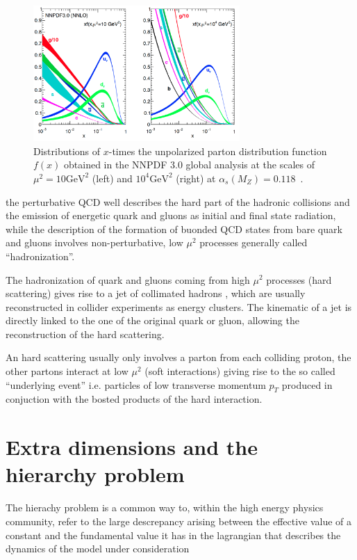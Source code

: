 \begin{figure}
  \centering
  \includegraphics[width = 0.7\textwidth]{figures/introduction/pdfs.png}
  \caption{
    Distributions of $x$-times the unpolarized parton distribution function $f(x)$
    obtained in the NNPDF 3.0 global analysis at the scales of $\mu^2 = 10 \mathrm{GeV}^2$ (left) and
    $10^4 \mathrm{GeV}^2$ (right) at $\alpha_s(M_Z) = 0.118$~\cite{pdfs}.}
  \label{fig:pdfs}
\end{figure}

the perturbative QCD well describes the hard part of the hadronic collisions and the emission of
energetic quark and gluons as initial and final state radiation,
while the description of the formation of buonded QCD states from bare quark and gluons involves non-perturbative, low $\mu^2$
processes generally called ``hadronization''. 

The hadronization of quark and gluons coming from high $\mu^2$ processes (hard scattering) gives rise
to a jet of collimated hadrons , which are usually reconstructed in collider experiments as energy clusters.
The kinematic of a jet is directly linked to the one of the original quark or gluon, allowing the reconstruction
of the hard scattering.

An hard scattering usually only involves a parton from each colliding proton, the other partons interact at low $\mu^2$
(soft interactions) giving rise to the so called ``underlying event'' i.e. particles of low transverse momentum $p_T$
produced in conjuction with the bosted products of the hard interaction.

\section{Extra dimensions and the hierarchy problem}
The hierachy problem is a common way to, within the high energy physics community, refer to the large
descrepancy arising between the effective value of a constant and the fundamental value it has
in the lagrangian that describes the dynamics of the model under consideration

